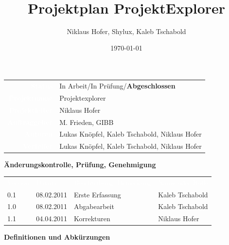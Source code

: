 \documentclass[10pt,paper=a4,final]{scrartcl}
\title{Projektplan ProjektExplorer}
\author{Niklaus Hofer, Shylux, Kaleb Tschabold}
\date{\today}
\begin{document}
\maketitle
\newpage
\begin{tabularx}{\textwidth}{ r X }	%
  \textcolor{white}{{\bf Status}}\cellcolor{blue!80!} &  In Arbeit/In Pr\"ufung/{\bf Abgeschlossen}\cellcolor{blue!20!} \\
\textcolor{white}{{\bf Projektname}}\cellcolor{blue!80!} & Projektexplorer\cellcolor{blue!20!} \\
\textcolor{white}{{\bf Projektleiter}}\cellcolor{blue!80!} & Niklaus Hofer\cellcolor{blue!20!} \\
\textcolor{white}{{\bf Auftraggeber}}\cellcolor{blue!80!} & M. Frieden, GIBB\cellcolor{blue!20!} \\
\textcolor{white}{{\bf Autoren}}\cellcolor{blue!80!} & Lukas Knöpfel, Kaleb Tschabold, Niklaus Hofer\cellcolor{blue!20!} \\
\textcolor{white}{{\bf Verteiler}}\cellcolor{blue!80!} & Lukas Knöpfel, Kaleb Tschabold, Niklaus Hofer\cellcolor{blue!20!}
\end{tabularx}
\newline
\newline
\newline
{\bf \"Anderungskontrolle, Pr\"ufung, Genehmigung}
\newline

\begin{tabularx}{\textwidth}{l l X X}
\textcolor{white}{Version}\cellcolor{blue!80!} & \textcolor{white}{Datum}\cellcolor{blue!80!} & \textcolor{white}{Beschreibung, Bemerkung}\cellcolor{blue!80!} & \textcolor{white}{Name oder Rolle}\cellcolor{blue!80!} \\
\cellcolor{blue!20!} 0.1 & \cellcolor{blue!20!} 08.02.2011 & \cellcolor{blue!20!} Erste Erfassung & \cellcolor{blue!20!} Kaleb Tschabold \\
\cellcolor{blue!20!} 1.0 & \cellcolor{blue!20!} 08.02.2011 & \cellcolor{blue!20!} Abgabearbeit & \cellcolor{blue!20!} Kaleb Tschabold \\
\cellcolor{blue!20!} 1.1 & \cellcolor{blue!20!} 04.04.2011 & \cellcolor{blue!20!} Korrekturen & \cellcolor{blue!20!} Niklaus Hofer\\
\end{tabularx}
\newline
\newline
\newline
{\bf Definitionen und Abk\"urzungen}
\newline
\end{document}
